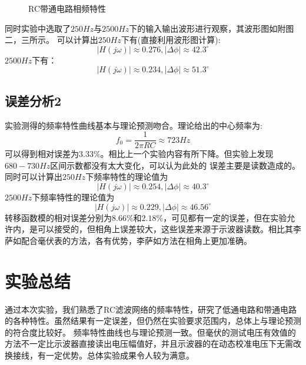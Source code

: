 \documentclass[a4paper,11pt,UTF8]{ctexart}
\begin{document}
  \begin{figure}[htbp]
    \centering
    \caption{RC带通电路相频特性}
    \label{fig:BPFPhi}
    \end{figure}
同时实验中选取了$250Hz$与$2500Hz$下的输入输出波形进行观察，其波形图如附图二，三所示。
可以计算出$250Hz$下有(直接利用波形图计算):
\begin{equation}
  |H(j\omega)|\approx0.276, |\Delta \phi|\approx42.3^\circ
\end{equation}
$2500Hz$下有：
\begin{equation}
  |H(j\omega)|\approx0.234, |\Delta \phi|\approx51.3^\circ
\end{equation}
\subsection{误差分析2}
实验测得的频率特性曲线基本与理论预测吻合。理论给出的中心频率为:
\begin{equation}
  f_0=\frac{1}{2\pi RC}\approx723Hz
\end{equation}
可以得到相对误差为$3.33\%$。相比上一个实验内容有所下降。但实验上发现$680-730Hz$区间示数都没有太大变化，可以认为此处的
误差主要是读数造成的。
同时可以计算出$250Hz$下频率特性的理论值为
\begin{equation}
  |H(j\omega)|\approx0.254, |\Delta \phi|\approx40.3^\circ
\end{equation}
$2500Hz$下频率特性的理论值为
\begin{equation}
  |H(j\omega)|\approx0.229, |\Delta \phi|\approx46.56^\circ
\end{equation}
转移函数模的相对误差分别为$8.66\%$和$2.18\%$，可见都有一定的误差，但在实验允许内，是可以接受的，但相角上误差较大，这些误差来源于示波器读数。相比其李萨如配合毫伏表的方法，各有优势，李萨如方法在相角上更加准确。
\section{实验总结}
通过本次实验，我们熟悉了RC滤波网络的频率特性，研究了低通电路和带通电路的各种特性。虽然结果有一定误差，但仍然在实验要求范围内，总体上与理论预测的符合度比较好。
频率特性曲线也与理论预测一致。但毫伏的测试电压有效值的方法不一定比示波器直接读出电压幅值好，并且示波器的在动态校准电压下无需改换接线，有一定优势。总体实验成果令人较为满意。
\end{document}

